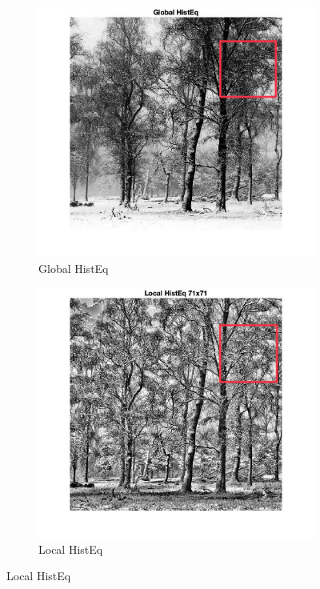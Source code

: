 \documentclass[12pt]{article}
\begin{document}
    \begin{figure}[h!]
        \centering
        
        \begin{subfigure}[b]{0.4\textwidth}
            \centering
            \includegraphics[width=\textwidth]{../images/LC2_globalHistEq_1.jpeg}
            \caption{Global HistEq}
        \end{subfigure}
        \hfill
        \begin{subfigure}[b]{0.4\textwidth}
            \centering
            \includegraphics[width=\textwidth]{../images/LC2_localHistEq_1.jpeg}
            \caption{Local HistEq}
        \end{subfigure}
        

\end{figure}
\end{document}
